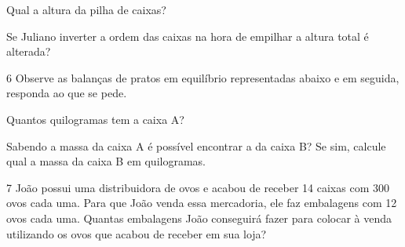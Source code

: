 \begin{escolha}
\item
  Qual a altura da pilha de caixas?



\item
  Se Juliano inverter a ordem das caixas na hora de empilhar a altura
  total é alterada? \preencher {}
\end{escolha}


\num{6} Observe as balanças de pratos em equilíbrio representadas abaixo e
em seguida, responda ao que se pede.


\begin{escolha}
\item Quantos quilogramas tem a caixa A?



\item Sabendo a massa da caixa A é possível encontrar a da caixa B? Se sim,
  calcule qual a massa da caixa B em quilogramas.


\end{escolha}


\num{7} João possui uma distribuidora de ovos e acabou de receber 14 caixas
com 300 ovos cada uma. Para que João venda essa mercadoria, ele faz
embalagens com 12 ovos cada uma. Quantas embalagens João conseguirá
fazer para colocar à venda utilizando os ovos que acabou de receber em
sua loja?


